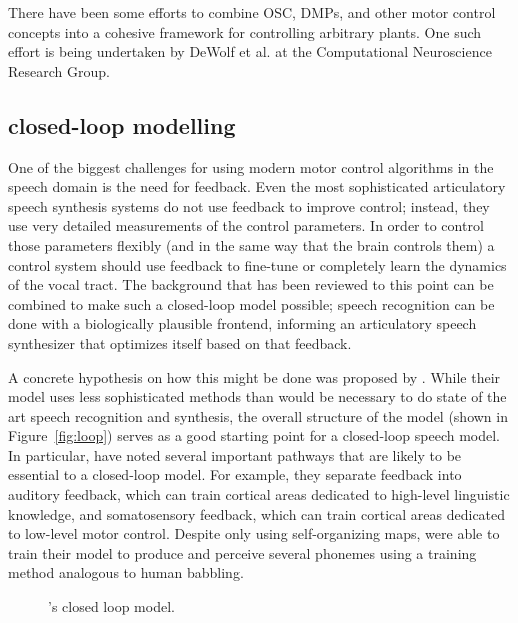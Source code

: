 \documentclass{article}
\begin{document}
There have been some efforts
to combine OSC, DMPs, and other motor control concepts
into a cohesive framework
for controlling arbitrary plants.
One such effort is being undertaken
by DeWolf et al. at the
Computational Neuroscience Research Group.

\subsection{closed-loop modelling}
\label{subsec:closed-loop}

One of the biggest challenges
for using modern motor control algorithms
in the speech domain
is the need for feedback.
Even the most sophisticated
articulatory speech synthesis systems
do not use feedback to improve control;
instead, they use very detailed measurements
of the control parameters.
In order to control those parameters flexibly
(and in the same way that the brain controls them)
a control system should use feedback
to fine-tune or completely learn
the dynamics of the vocal tract.
The background that has been reviewed
to this point can be combined
to make such a closed-loop model possible;
speech recognition can be done
with a biologically plausible frontend,
informing an articulatory speech synthesizer
that optimizes itself based on that feedback.

A concrete hypothesis on how
this might be done was proposed by
\citet{kroger2009}.
While their model uses less sophisticated
methods than would be necessary
to do state of the art
speech recognition and synthesis,
the overall structure of the model
(shown in Figure~\ref{fig:loop})
serves as a good starting point
for a closed-loop speech model.
In particular, \citeauthor{kroger2009} have
noted several important pathways
that are likely to be essential
to a closed-loop model.
For example, they separate feedback
into auditory feedback,
which can train cortical areas
dedicated to high-level linguistic knowledge,
and somatosensory feedback,
which can train cortical areas
dedicated to low-level motor control.
Despite only using self-organizing maps,
\citeauthor{korger2009} were able to train their model
to produce and perceive several phonemes
using a training method analogous
to human babbling.

\begin{figure}
  \begin{center}
  \end{center}
  \caption{\citeauthor{kroger2009}'s closed loop model.}
  \label{fig:kroeger}
\end{figure}
\end{document}
